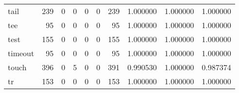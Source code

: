 \begin{longtable}{lrrrrrrrrr}
tail      &                                   239 &                                                  0 &                                                  0 &                                                  0 &                                                  0 &                                                239 &                                           1.000000 &                               1.000000 &                             1.000000 \\
tee       &                                    95 &                                                  0 &                                                  0 &                                                  0 &                                                  0 &                                                 95 &                                           1.000000 &                               1.000000 &                             1.000000 \\
test      &                                   155 &                                                  0 &                                                  0 &                                                  0 &                                                  0 &                                                155 &                                           1.000000 &                               1.000000 &                             1.000000 \\
timeout   &                                    95 &                                                  0 &                                                  0 &                                                  0 &                                                  0 &                                                 95 &                                           1.000000 &                               1.000000 &                             1.000000 \\
touch     &                                   396 &                                                  0 &                                                  5 &                                                  0 &                                                  0 &                                                391 &                                           0.990530 &                               1.000000 &                             0.987374 \\
tr        &                                   153 &                                                  0 &                                                  0 &                                                  0 &                                                  0 &                                                153 &                                           1.000000 &                               1.000000 &                             1.000000 \\

\end{longtable}
